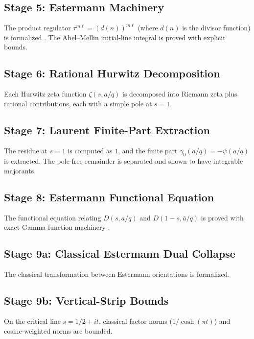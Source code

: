 \documentclass[11pt,a4paper]{article}
\theoremstyle{plain}
\theoremstyle{definition}
\theoremstyle{remark}
\begin{document}
\subsection{Stage 5: Estermann Machinery}

The product regulator $\tau^{m\ell} = (d(n))^{m\ell}$ (where $d(n)$ is the divisor function) is formalized \cite{Estermann1928}. The Abel--Mellin initial-line integral is proved with explicit bounds.

\subsection{Stage 6: Rational Hurwitz Decomposition}

Each Hurwitz zeta function $\zeta(s, a/q)$ is decomposed into Riemann zeta plus rational contributions, each with a simple pole at $s=1$.

\subsection{Stage 7: Laurent Finite-Part Extraction}

The residue at $s=1$ is computed as $1$, and the finite part $\gamma_0(a/q) = -\psi(a/q)$ is extracted. The pole-free remainder is separated and shown to have integrable majorants.

\subsection{Stage 8: Estermann Functional Equation}

The functional equation relating $D(s, a/q)$ and $D(1-s, \bar{a}/q)$ is proved with exact Gamma-function machinery \cite{Estermann1928}.

\subsection{Stage 9a: Classical Estermann Dual Collapse}

The classical transformation between Estermann orientations is formalized.

\subsection{Stage 9b: Vertical-Strip Bounds}

On the critical line $s = 1/2 + it$, classical factor norms ($1/\cosh(\pi t)$) and cosine-weighted norms are bounded.
\end{document}
